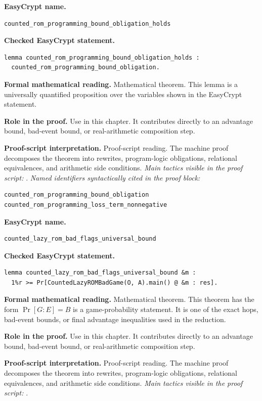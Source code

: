 \begin{formaltheorem}
\noindent\textbf{EasyCrypt name.}
\begin{lstlisting}[language=EasyCrypt,basicstyle=\ttfamily\scriptsize]
counted_rom_programming_bound_obligation_holds
\end{lstlisting}
\noindent\textbf{Checked EasyCrypt statement.}
\begin{lstlisting}[language=EasyCrypt,basicstyle=\ttfamily\scriptsize]
lemma counted_rom_programming_bound_obligation_holds :
  counted_rom_programming_bound_obligation.
\end{lstlisting}
\noindent\textbf{Formal mathematical reading.}
Mathematical theorem. This lemma is a universally quantified proposition over the variables shown in the EasyCrypt statement.

\noindent\textbf{Role in the proof.}
Use in this chapter. It contributes directly to an advantage bound, bad-event bound, or real-arithmetic composition step.

\noindent\textbf{Proof-script interpretation.}
Proof-script reading. The machine proof decomposes the theorem into rewrites, program-logic obligations, relational equivalences, and arithmetic side conditions.
\emph{Main tactics visible in the proof script:} .
\emph{Named identifiers syntactically cited in the proof block:}
\begin{lstlisting}[language=EasyCrypt,basicstyle=\ttfamily\scriptsize]
counted_rom_programming_bound_obligation
counted_rom_programming_loss_term_nonnegative
\end{lstlisting}

\end{formaltheorem}

\begin{formaltheorem}
\noindent\textbf{EasyCrypt name.}
\begin{lstlisting}[language=EasyCrypt,basicstyle=\ttfamily\scriptsize]
counted_lazy_rom_bad_flags_universal_bound
\end{lstlisting}
\noindent\textbf{Checked EasyCrypt statement.}
\begin{lstlisting}[language=EasyCrypt,basicstyle=\ttfamily\scriptsize]
lemma counted_lazy_rom_bad_flags_universal_bound &m :
  1%r >= Pr[CountedLazyROMBadGame(O, A).main() @ &m : res].
\end{lstlisting}
\noindent\textbf{Formal mathematical reading.}
Mathematical theorem. This theorem has the form \(\Pr[G:E] = B\) is a game-probability statement.  It is one of the exact hops, bad-event bounds, or final advantage inequalities used in the reduction.

\noindent\textbf{Role in the proof.}
Use in this chapter. It contributes directly to an advantage bound, bad-event bound, or real-arithmetic composition step.

\noindent\textbf{Proof-script interpretation.}
Proof-script reading. The machine proof decomposes the theorem into rewrites, program-logic obligations, relational equivalences, and arithmetic side conditions.
\emph{Main tactics visible in the proof script:} .

\end{formaltheorem}

